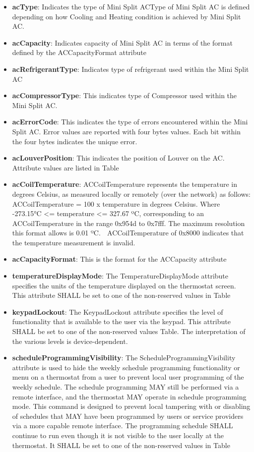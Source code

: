\begin{itemize}
\item \textbf{acType}: Indicates the type of Mini Split ACType of Mini Split AC is defined depending on how Cooling and Heating condition is achieved by Mini Split AC.
\item \textbf{acCapacity}:  Indicates capacity of Mini Split AC in terms of the format defined by the ACCapacityFormat attribute
\item \textbf{acRefrigerantType}: Indicates type of refrigerant used within the Mini Split AC
\item \textbf{acCompressorType}: This indicates type of Compressor used within the Mini Split AC.
\item \textbf{acErrorCode}: This indicates the type of errors encountered within the Mini Split AC. Error values are reported with four bytes values. Each bit within the four bytes indicates the unique error.
\item \textbf{acLouverPosition}: This indicates the position of Louver on the AC. Attribute values are listed in Table
\item \textbf{acCoilTemperature}: ACCoilTemperature represents the temperature in degrees Celsius, as measured locally or remotely (over the network) as follows: ACCoilTemperature = 100 x temperature in degrees Celsius. Where -273.15°C <= temperature <= 327.67 ºC, corresponding to an ACCoilTemperature in the range 0x954d to 0x7fff. The maximum resolution this format allows is 0.01 ºC.  ACCoilTemperature of 0x8000 indicates that the temperature measurement is invalid.
\item \textbf{acCapacityFormat}: This is the format for the ACCapacity attribute
\item \textbf{temperatureDisplayMode}: The TemperatureDisplayMode attribute specifies the units of the temperature displayed on the thermostat screen. This attribute SHALL be set to one of the non-reserved values in Table
\item \textbf{keypadLockout}: The KeypadLockout attribute specifies the level of functionality that is available to the user via the keypad. This attribute SHALL be set to one of the non-reserved values Table. The interpretation of the various levels is device-dependent.
\item \textbf{scheduleProgrammingVisibility}: The ScheduleProgrammingVisibility attribute is used to hide the weekly schedule programming functionality or menu on a thermostat from a user to prevent local user programming of the weekly schedule. The schedule programming MAY still be performed via a remote interface, and the thermostat MAY operate in schedule programming mode. This command is designed to prevent local tampering with or disabling of schedules that MAY have been programmed by users or service providers via a more capable remote interface. The programming schedule SHALL continue to run even though it is not visible to the user locally at the thermostat. It SHALL be set to one of the non-reserved values in Table
\end{itemize}

